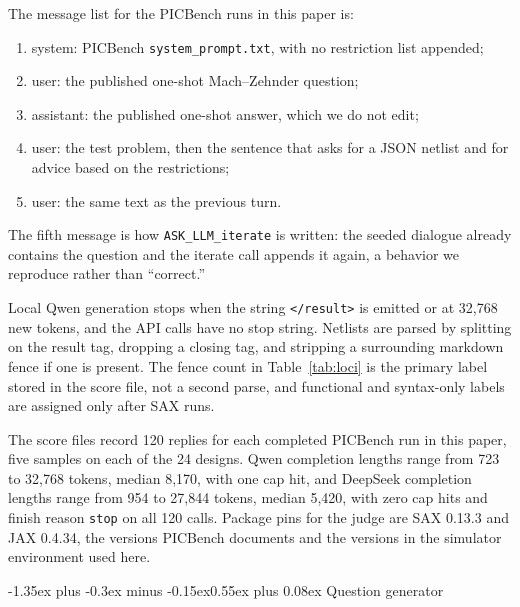 \documentclass[11pt]{article}
\makeatletter
\renewcommand\section{\@startsection{section}{1}{\z@}%
  {-1.35ex plus -0.3ex minus -0.15ex}{0.55ex plus 0.08ex}%
  {\normalfont\large\bfseries}}
\makeatother
\begin{document}
The message list for the PICBench runs in this paper is:
\begin{enumerate}
\item system: PICBench \texttt{system\_prompt.txt}, with no restriction list appended;
\item user: the published one-shot Mach--Zehnder question;
\item assistant: the published one-shot answer, which we do not edit;
\item user: the test problem, then the sentence that asks for a JSON netlist and for advice based on the restrictions;
\item user: the same text as the previous turn.
\end{enumerate}
The fifth message is how \texttt{ASK\_LLM\_iterate} is written: the seeded dialogue already contains the question and the iterate call appends it again, a behavior we reproduce rather than ``correct.''

Local Qwen generation stops when the string \texttt{\textless /result\textgreater} is emitted or at 32{,}768 new tokens, and the API calls have no stop string.
Netlists are parsed by splitting on the result tag, dropping a closing tag, and stripping a surrounding markdown fence if one is present.
The fence count in Table~\ref{tab:loci} is the primary label stored in the score file, not a second parse, and functional and syntax-only labels are assigned only after SAX runs.

The score files record 120 replies for each completed PICBench run in this paper, five samples on each of the 24 designs.
Qwen completion lengths range from 723 to 32{,}768 tokens, median 8{,}170, with one cap hit, and DeepSeek completion lengths range from 954 to 27{,}844 tokens, median 5{,}420, with zero cap hits and finish reason \texttt{stop} on all 120 calls.
Package pins for the judge are SAX 0.13.3 and JAX 0.4.34, the versions PICBench documents and the versions in the simulator environment used here.

\section{Question generator}
\label{app:questions}
\end{document}
